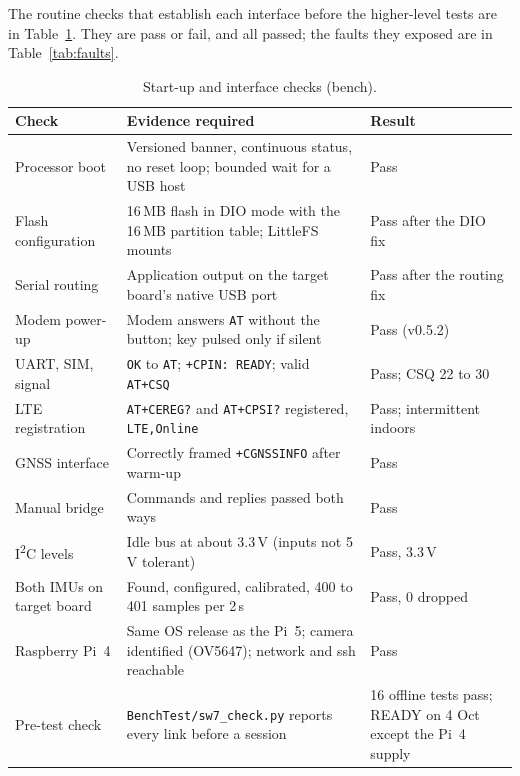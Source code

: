 The routine checks that establish each interface before the higher-level tests are in Table~\ref{tab:startup-checks}. They are pass or fail, and all passed; the faults they exposed are in Table~\ref{tab:faults}.

\begin{table}[htbp]
\centering
\small
\caption[Start-up and interface checks (bench)]{Start-up and interface checks (bench).}
\label{tab:startup-checks}
\begin{tabular}{|p{3.4cm}|p{6.2cm}|p{4.4cm}|}
\hline
\textbf{Check} & \textbf{Evidence required} & \textbf{Result} \\ \hline
Processor boot & Versioned banner, continuous status, no reset loop; bounded wait for a USB host & Pass \\ \hline
Flash configuration & 16\,MB flash in DIO mode with the 16\,MB partition table; LittleFS mounts & Pass after the DIO fix \\ \hline
Serial routing & Application output on the target board's native USB port & Pass after the routing fix \\ \hline
Modem power-up & Modem answers \texttt{AT} without the button; key pulsed only if silent & Pass (v0.5.2) \\ \hline
UART, SIM, signal & \texttt{OK} to \texttt{AT}; \texttt{+CPIN: READY}; valid \texttt{AT+CSQ} & Pass; CSQ 22 to 30 \\ \hline
LTE registration & \texttt{AT+CEREG?} and \texttt{AT+CPSI?} registered, \texttt{LTE,Online} & Pass; intermittent indoors \\ \hline
GNSS interface & Correctly framed \texttt{+CGNSSINFO} after warm-up & Pass \\ \hline
Manual bridge & Commands and replies passed both ways & Pass \\ \hline
I\textsuperscript{2}C levels & Idle bus at about 3.3\,V (inputs not 5\,V tolerant) & Pass, 3.3\,V \\ \hline
Both IMUs on target board & Found, configured, calibrated, 400 to 401 samples per 2\,s & Pass, 0 dropped \\ \hline
Raspberry Pi~4 & Same OS release as the Pi~5; camera identified (OV5647); network and ssh reachable & Pass \\ \hline
Pre-test check & \texttt{BenchTest/sw7\_check.py} reports every link before a session & 16 offline tests pass; READY on 4 Oct except the Pi~4 supply \\ \hline
\end{tabular}
\end{table}
